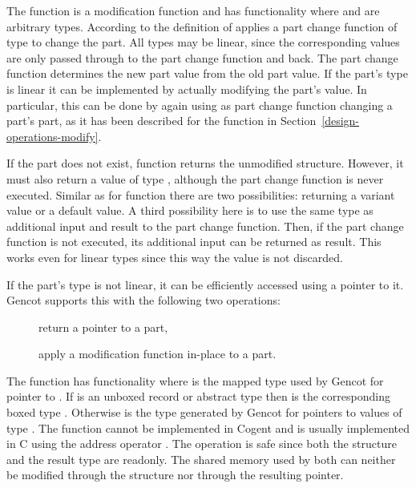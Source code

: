 The function  is a modification function and has functionality  where 
 and  are arbitrary types.
According to the definition of   applies a part change function of
type  to change the part. All types may be linear, since the corresponding values are
only passed through to the part change function and back.
The part change function determines the new part value from the old part value. If the part's type 
is linear it can be implemented by actually modifying the part's value. In particular, this can be done by
again using  as part change function changing a part's part, as it has been described
for the  function in Section~\ref{design-operations-modify}.

If the part does not exist, function  returns the unmodified structure. However, it must also
return a value of type , although the part change function is never executed. Similar as for 
function  there are two possibilities: returning a variant value or a default value. A third
possibility here is to use the same type  as additional input and result to the part change
function. Then, if the part change function is not executed, its additional input can be returned
as result. This works even for linear types  since this way the value is not discarded.

If the part's type  is not linear, it can be efficiently accessed using a pointer to it.
Gencot supports this with the following two operations:
\begin{description}
  \item[] return a pointer to a part,
  \item[] apply a modification function in-place to a part.
\end{description}

The function  has functionality  where  is the mapped type used by Gencot
for pointer to . If  is an unboxed record or abstract type  then  is the
corresponding boxed type . Otherwise  is the type  generated by Gencot for pointers
to values of type . The function cannot be implemented in Cogent and is usually implemented in C using the address 
operator \code{\&}. The operation is safe since both the structure and the result type are readonly. The shared
memory used by both can neither be modified through the structure nor through the resulting pointer. 

